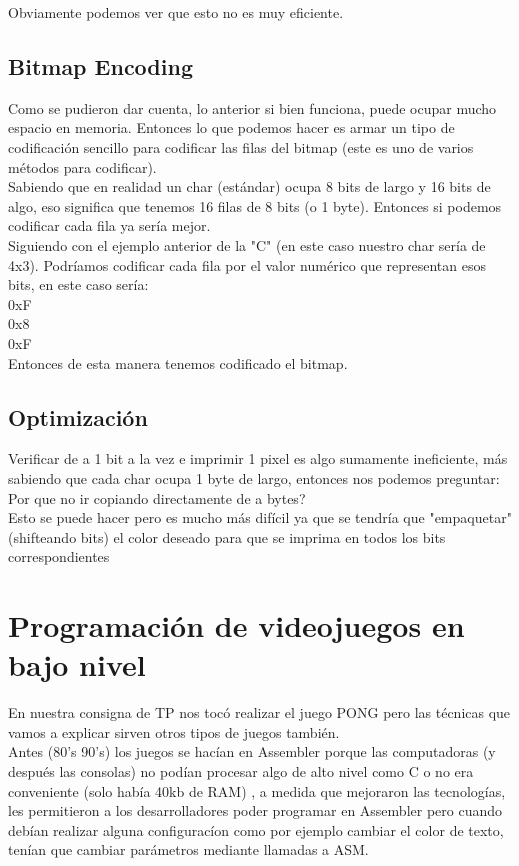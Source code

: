 \documentclass[]{article}
\begin{document}
Obviamente podemos ver que esto no es muy eficiente.\\

\subsection*{Bitmap Encoding}
Como se pudieron dar cuenta, lo anterior si bien funciona, puede ocupar mucho espacio en memoria. Entonces lo que podemos hacer es armar un tipo de codificaci\'on sencillo para codificar las filas del bitmap (este es uno de varios m\'etodos para codificar).\\

Sabiendo que en realidad un char (est\'andar) ocupa 8 bits de largo y 16 bits de algo, eso significa que tenemos 16 filas de 8 bits (o 1 byte). Entonces si podemos codificar cada fila ya ser\'ia mejor.\\

Siguiendo con el ejemplo anterior de la "C" (en este caso nuestro char ser\'ia de 4x3). Podr\'iamos codificar cada fila por el valor num\'erico que representan esos bits, en este caso ser\'ia:\\
0xF\\
0x8\\
0xF\\
Entonces de esta manera tenemos codificado el bitmap.

\subsection*{Optimizaci\'on}
Verificar de a 1 bit a la vez e imprimir 1 pixel es algo sumamente ineficiente, m\'as sabiendo que cada char ocupa 1 byte de largo, entonces nos podemos preguntar: Por que no ir copiando directamente de a bytes?\\

Esto se puede hacer pero es mucho m\'as dif\'icil ya que se tendr\'ia que "empaquetar" (shifteando bits) el color deseado para que se imprima en todos los bits correspondientes


\section*{Programaci\'on de videojuegos en bajo nivel}
En nuestra consigna de TP nos toc\'o realizar el juego PONG pero las t\'ecnicas que vamos a explicar sirven otros tipos de juegos tambi\'en.\\

Antes (80's 90's) los juegos se hac\'ian en Assembler porque las computadoras (y despu\'es las consolas) no pod\'ian procesar algo de alto nivel como C o no era conveniente (solo hab\'ia 40kb de RAM) , a medida que mejoraron las tecnolog\'ias, les permitieron a los desarrolladores poder programar en Assembler pero cuando deb\'ian realizar alguna configurac\'ion como por ejemplo cambiar el color de texto, ten\'ian que cambiar par\'ametros mediante llamadas a ASM.\\
\end{document}
